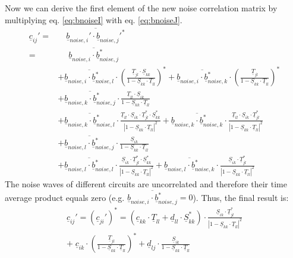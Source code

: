 \documentclass[10pt]{report}
\begin{document}
Now we can derive the first element of the new noise correlation
matrix by multiplying eq. \eqref{eq:bnoiseI} with eq. \eqref{eq:bnoiseJ}.
\begin{equation}
\begin{split}
\underline{c}_{ij}' = & \quad \overline{\underline{b}_{noise,i}'\cdot\underline{b}_{noise,j}'^*} \\
 = & \quad\; \overline{\underline{b}_{noise,i}\cdot\underline{b}_{noise,j}^*} \\
 & + \overline{\underline{b}_{noise,i}\cdot\underline{b}_{noise,l}^*}\cdot
       \left( \frac{\underline{T}_{jl}\cdot \underline{S}_{kk}}{1-\underline{S}_{kk}\cdot\underline{T}_{ll}}
                \right)^* +
       \overline{\underline{b}_{noise,i}\cdot\underline{b}_{noise,k}^*}\cdot
       \left( \frac{\underline{T}_{jl}}{1-\underline{S}_{kk}\cdot\underline{T}_{ll}} \right) ^* \\
 & + \overline{\underline{b}_{noise,k}\cdot\underline{b}_{noise,j}^*}\cdot
       \frac{\underline{T}_{ll}\cdot \underline{S}_{ik}}{1-\underline{S}_{kk}\cdot\underline{T}_{ll}} \\
 & + \overline{\underline{b}_{noise,k}\cdot\underline{b}_{noise,l}^*}\cdot
       \frac{\underline{T}_{ll}\cdot \underline{S}_{ik}\cdot \underline{T}_{jl}^* \cdot\underline{S}_{kk}^*}
            {| 1-\underline{S}_{kk}\cdot\underline{T}_{ll} |^2} +
       \overline{\underline{b}_{noise,k}\cdot\underline{b}_{noise,k}^*}\cdot
       \frac{\underline{T}_{ll}\cdot \underline{S}_{ik}\cdot \underline{T}_{jl}^*}
            {| 1-\underline{S}_{kk}\cdot\underline{T}_{ll} |^2} \\
 & + \overline{\underline{b}_{noise,l}\cdot\underline{b}_{noise,j}^*}\cdot
       \frac{\underline{S}_{ik}}{1-\underline{S}_{kk}\cdot\underline{T}_{ll}} \\
 & + \overline{\underline{b}_{noise,l}\cdot\underline{b}_{noise,l}^*}\cdot
       \frac{\underline{S}_{ik}\cdot \underline{T}_{jl}^*\cdot \underline{S}_{kk}^*}
            {| 1-\underline{S}_{kk}\cdot\underline{T}_{ll} |^2} +
       \overline{\underline{b}_{noise,l}\cdot\underline{b}_{noise,k}^*}\cdot
       \frac{\underline{S}_{ik}\cdot \underline{T}_{jl}^*}
            {| 1-\underline{S}_{kk}\cdot\underline{T}_{ll} |^2}
\end{split}
\end{equation}
The noise waves of different circuits are uncorrelated and therefore
their time average product equals zero (e.g.
$\overline{\underline{b}_{noise,i}\cdot\underline{b}_{noise,j}^*} =
0$).  Thus, the final result is:
\begin{equation}
\begin{split}
\underline{c}_{ij}' = (\underline{c}_{ji}')^* =
   (\underline{c}_{kk}\cdot\underline{T}_{ll} + \underline{d}_{ll}\cdot\underline{S}_{kk}^*)\cdot
   \frac{\underline{S}_{ik}\cdot\underline{T}_{jl}^*}{|1-\underline{S}_{kk}\cdot\underline{T}_{ll}|^2}
\\ + \;\underline{c}_{ik}\cdot
     \left(\frac{\underline{T}_{jl}}{1-\underline{S}_{kk}\cdot\underline{T}_{ll}}\right)^*
   + \underline{d}_{lj}\cdot
     \frac{\underline{S}_{ik}}{1-\underline{S}_{kk}\cdot\underline{T}_{ll}}
\end{split}
\end{equation}
\end{document}
